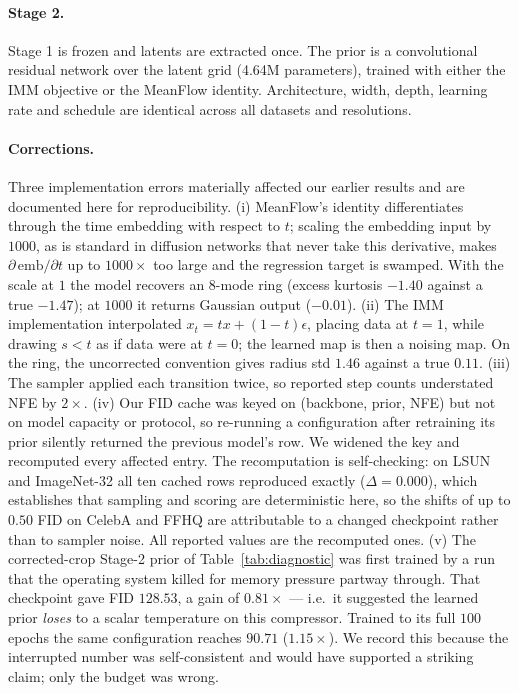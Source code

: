 \documentclass[sigconf,nonacm]{acmart}
\begin{document}
\paragraph{Stage 2.}
Stage 1 is frozen and latents are extracted once. The prior is a convolutional
residual network over the latent grid (4.64M parameters), trained with either
the IMM objective or the MeanFlow identity. Architecture, width, depth,
learning rate and schedule are identical across all datasets and resolutions.

\paragraph{Corrections.}
Three implementation errors materially affected our earlier results and are
documented here for reproducibility. (i) MeanFlow's identity differentiates
through the time embedding with respect to $t$; scaling the embedding input by
$1000$, as is standard in diffusion networks that never take this derivative,
makes $\partial\,\mathrm{emb}/\partial t$ up to $1000\times$ too large and the
regression target is swamped. With the scale at $1$ the model recovers an
8-mode ring (excess kurtosis $-1.40$ against a true $-1.47$); at $1000$ it
returns Gaussian output ($-0.01$). (ii) The IMM implementation interpolated
$x_t = t x + (1-t)\epsilon$, placing data at $t{=}1$, while drawing $s<t$ as if
data were at $t{=}0$; the learned map is then a noising map. On the ring, the
uncorrected convention gives radius std $1.46$ against a true $0.11$. (iii) The
sampler applied each transition twice, so reported step counts understated NFE
by $2\times$. (iv) Our FID cache was keyed on (backbone, prior, NFE) but not on
model capacity or protocol, so re-running a configuration after retraining its
prior silently returned the previous model's row. We widened the key and
recomputed every affected entry. The recomputation is self-checking: on LSUN and
ImageNet-32 all ten cached rows reproduced exactly ($\Delta = 0.000$), which
establishes that sampling and scoring are deterministic here, so the shifts of
up to $0.50$ FID on CelebA and FFHQ are attributable to a changed checkpoint
rather than to sampler noise. All reported values are the recomputed ones. (v) The corrected-crop
Stage-2 prior of Table~\ref{tab:diagnostic} was first trained by a run that the
operating system killed for memory pressure partway through. That checkpoint
gave FID $128.53$, a gain of $0.81\times$ --- i.e.\ it
suggested the learned prior \emph{loses} to a scalar temperature on this
compressor. Trained to its full $100$ epochs the same configuration reaches $90.71$ ($1.15\times$). We record this because
the interrupted number was self-consistent and would have supported a striking
claim; only the budget was wrong.
\end{document}
